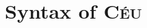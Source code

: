 \documentclass[11pt,a4paper]{article}
\newcommand{\2}{\;\;}
\newcommand{\5}{\;\;\;\;\;}
\newcommand{\CEU}{\textsc{C\'{e}u}}
\begin{document}

\appendix %
\newpage

\section{Syntax of \CEU}
\label{sec:syntax}
\end{document}
